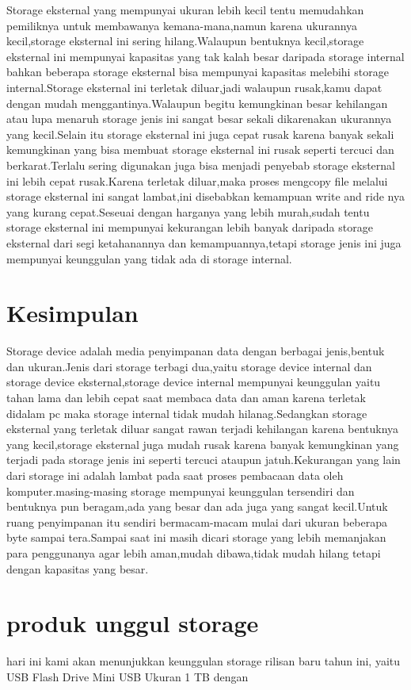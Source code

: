 Storage eksternal yang mempunyai ukuran lebih kecil tentu memudahkan pemiliknya untuk membawanya kemana-mana,namun karena ukurannya kecil,storage eksternal ini sering hilang.Walaupun bentuknya kecil,storage eksternal ini mempunyai kapasitas yang tak kalah besar daripada storage internal bahkan beberapa storage eksternal bisa mempunyai kapasitas melebihi storage internal.Storage eksternal ini terletak diluar,jadi walaupun rusak,kamu dapat dengan mudah menggantinya.Walaupun begitu kemungkinan besar kehilangan atau lupa menaruh storage jenis ini sangat besar sekali dikarenakan ukurannya yang kecil.Selain itu storage eksternal ini juga cepat rusak karena banyak sekali kemungkinan yang bisa membuat storage eksternal ini rusak seperti tercuci dan berkarat.Terlalu sering digunakan juga bisa menjadi penyebab storage eksternal ini lebih cepat rusak.Karena terletak diluar,maka proses mengcopy file melalui storage eksternal ini sangat lambat,ini disebabkan kemampuan write and ride nya yang kurang cepat.Seseuai dengan harganya yang lebih murah,sudah tentu storage eksternal ini mempunyai kekurangan lebih banyak daripada storage eksternal dari segi ketahanannya dan kemampuannya,tetapi storage jenis ini juga mempunyai keunggulan yang tidak ada di storage internal.

\section{Kesimpulan}

Storage device adalah media penyimpanan data dengan berbagai jenis,bentuk dan ukuran.Jenis dari storage terbagi dua,yaitu storage device internal dan storage device eksternal,storage device internal mempunyai keunggulan yaitu tahan lama dan lebih cepat saat membaca data dan aman karena terletak didalam pc maka storage internal tidak mudah hilanag.Sedangkan storage eksternal yang terletak diluar sangat rawan terjadi kehilangan karena bentuknya yang kecil,storage eksternal juga mudah rusak karena banyak kemungkinan yang terjadi pada storage jenis ini seperti tercuci ataupun jatuh.Kekurangan yang lain dari storage ini adalah lambat pada saat proses pembacaan data oleh komputer.masing-masing storage mempunyai keunggulan tersendiri dan bentuknya pun beragam,ada yang besar dan ada juga yang sangat kecil.Untuk ruang penyimpanan itu sendiri bermacam-macam mulai dari ukuran beberapa byte sampai tera.Sampai saat ini masih dicari storage yang lebih memanjakan para penggunanya agar lebih aman,mudah dibawa,tidak mudah hilang tetapi dengan kapasitas yang besar.

\section{produk unggul storage}
hari ini kami akan menunjukkan keunggulan storage rilisan baru tahun ini, yaitu USB Flash Drive Mini USB Ukuran 1 TB dengan 


